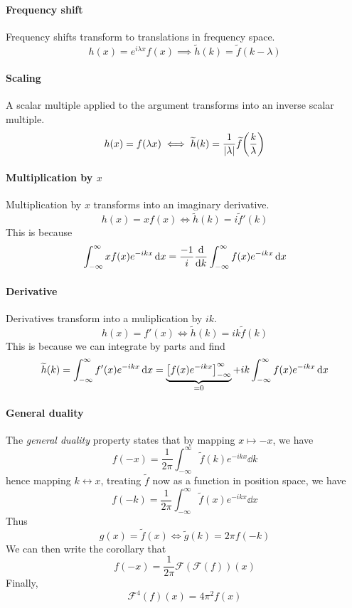 \documentclass[a4paper]{article}
\begin{document}
\paragraph{Frequency shift} Frequency shifts transform to translations in frequency space.
\[
	h(x) = e^{i\lambda x}f(x) \implies \widetilde h(k) = \widetilde f(k - \lambda)
\]

\paragraph{Scaling} A scalar multiple applied to the argument transforms into an inverse scalar multiple.
\[
	h(x) = f(\lambda x) \iff \widetilde h(k) = \frac{1}{\abs{\lambda}} \widetilde f\qty(\frac{k}{\lambda})
\]

\paragraph{Multiplication by $x$} Multiplication by \( x \) transforms into an imaginary derivative.
\[
	h(x) = xf(x) \iff \widetilde h(k) = i\widetilde f'(k)
\]
This is because
\[
	\int_{-\infty}^\infty xf(x) e^{-ikx} \dd{x} = \frac{-1}{i} \dv{k} \int_{-\infty}^\infty f(x) e^{-ikx} \dd{x}
\]

\paragraph{Derivative} Derivatives transform into a muliplication by \( ik \).
\[
	h(x) = f'(x) \iff \widetilde h(k) = ik \widetilde f(k)
\]
This is because we can integrate by parts and find
\[
	\widetilde h(k) = \int_{-\infty}^\infty f'(x) e^{-ikx} \dd{x} = \underbrace{\qty[f(x) e^{-ikx}]_{-\infty}^\infty}_{=0} + ik\int_{-\infty}^\infty f(x) e^{-ikx} \dd{x}
\]

\paragraph{General duality} The \textit{general duality} property states that by mapping \( x \mapsto -x \), we have
\[
	f(-x) = \frac{1}{2\pi} \int_{-\infty}^\infty \widetilde f(k) e^{-ikx} \dd{k}
\]
hence mapping \( k \leftrightarrow x \), treating \( \widetilde f \) now as a function in position space, we have
\[
	f(-k) = \frac{1}{2\pi} \int_{-\infty}^\infty \widetilde f(x) e^{-ikx} \dd{x}
\]
Thus
\[
	g(x) = \widetilde f(x) \iff \widetilde g(k) = 2\pi f(-k)
\]
We can then write the corollary that
\[
	f(-x) = \frac{1}{2\pi} \mathcal F(\mathcal F(f))(x)
\]
Finally,
\[
	\mathcal F^4(f)(x) = 4\pi^2 f(x)
\]
\end{document}
